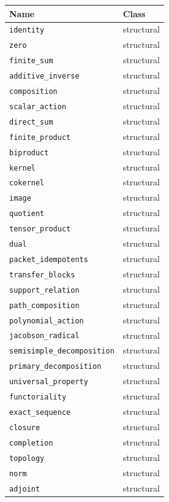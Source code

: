 \documentclass[a4paper,11pt]{article}
\begin{document}
\begin{longtable}{@{}p{}p{}@{}}\toprule Name & Class\\\midrule\endhead
\nolinkurl{identity} & structural\\
\nolinkurl{zero} & structural\\
\nolinkurl{finite_sum} & structural\\
\nolinkurl{additive_inverse} & structural\\
\nolinkurl{composition} & structural\\
\nolinkurl{scalar_action} & structural\\
\nolinkurl{direct_sum} & structural\\
\nolinkurl{finite_product} & structural\\
\nolinkurl{biproduct} & structural\\
\nolinkurl{kernel} & structural\\
\nolinkurl{cokernel} & structural\\
\nolinkurl{image} & structural\\
\nolinkurl{quotient} & structural\\
\nolinkurl{tensor_product} & structural\\
\nolinkurl{dual} & structural\\
\nolinkurl{packet_idempotents} & structural\\
\nolinkurl{transfer_blocks} & structural\\
\nolinkurl{support_relation} & structural\\
\nolinkurl{path_composition} & structural\\
\nolinkurl{polynomial_action} & structural\\
\nolinkurl{jacobson_radical} & structural\\
\nolinkurl{semisimple_decomposition} & structural\\
\nolinkurl{primary_decomposition} & structural\\
\nolinkurl{universal_property} & structural\\
\nolinkurl{functoriality} & structural\\
\nolinkurl{exact_sequence} & structural\\
\nolinkurl{closure} & structural\\
\nolinkurl{completion} & structural\\
\nolinkurl{topology} & structural\\
\nolinkurl{norm} & structural\\
\nolinkurl{adjoint} & structural\\

\end{longtable}
\end{document}
